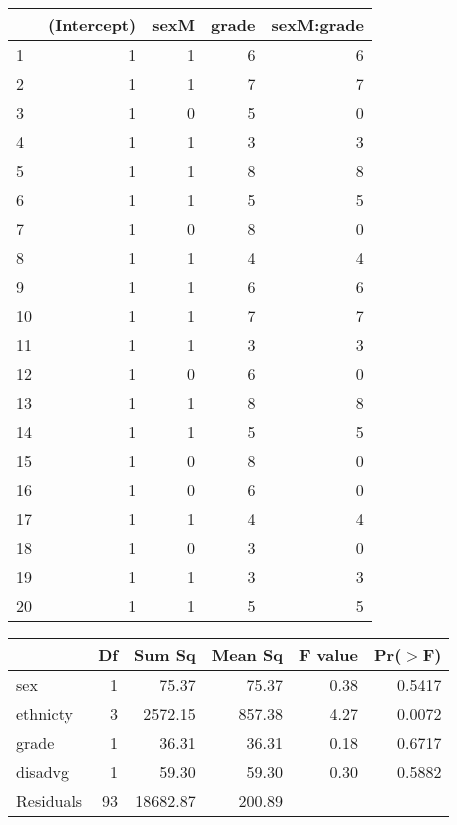 \begin{table}[ht]
\centering
\begin{tabular}{lrrrr}
  \hline
 & (Intercept) & sexM & grade & sexM:grade \\ 
  \hline
1 & 1 & 1 & 6 & 6 \\ 
  2 & 1 & 1 & 7 & 7 \\ 
  3 & 1 & 0 & 5 & 0 \\ 
  4 & 1 & 1 & 3 & 3 \\ 
  5 & 1 & 1 & 8 & 8 \\ 
  6 & 1 & 1 & 5 & 5 \\ 
  7 & 1 & 0 & 8 & 0 \\ 
  8 & 1 & 1 & 4 & 4 \\ 
  9 & 1 & 1 & 6 & 6 \\ 
  10 & 1 & 1 & 7 & 7 \\ 
  11 & 1 & 1 & 3 & 3 \\ 
  12 & 1 & 0 & 6 & 0 \\ 
  13 & 1 & 1 & 8 & 8 \\ 
  14 & 1 & 1 & 5 & 5 \\ 
  15 & 1 & 0 & 8 & 0 \\ 
  16 & 1 & 0 & 6 & 0 \\ 
  17 & 1 & 1 & 4 & 4 \\ 
  18 & 1 & 0 & 3 & 0 \\ 
  19 & 1 & 1 & 3 & 3 \\ 
  20 & 1 & 1 & 5 & 5 \\ 
   \hline
\end{tabular}
\end{table}
\begin{table}[ht]
\centering
\begin{tabular}{lrrrrr}
  \hline
 & Df & Sum Sq & Mean Sq & F value & Pr($>$F) \\ 
  \hline
sex & 1 & 75.37 & 75.37 & 0.38 & 0.5417 \\ 
  ethnicty & 3 & 2572.15 & 857.38 & 4.27 & 0.0072 \\ 
  grade & 1 & 36.31 & 36.31 & 0.18 & 0.6717 \\ 
  disadvg & 1 & 59.30 & 59.30 & 0.30 & 0.5882 \\ 
  Residuals & 93 & 18682.87 & 200.89 &  &  \\ 
   \hline
\end{tabular}
\end{table}
